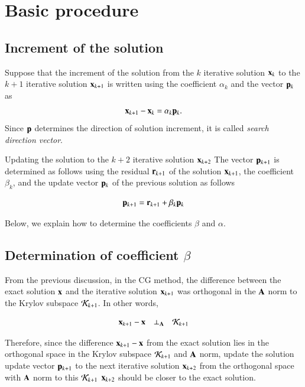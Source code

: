 \section{Basic procedure}


\subsection{Increment of the solution}

Suppose that the increment of the solution from the $k$ iterative solution $\mathbf{x}_{k}$ to the $k+1$ iterative solution $\mathbf{x}_{k+1}$ is written using the coefficient $\alpha_k$ and the vector $\mathbf{p}_k$ as
%
\begin{equation}
\mathbf{x}_{k+1}-\mathbf{x}_{k}=\alpha_{k}\mathbf{p}_{k}.
\end{equation}
%
Since $\mathbf{p}$ determines the direction of solution increment, it is called \emph{search direction vector}.



Updating the solution to the $k+2$ iterative solution $\mathbf{x}_{k+2}$ The vector $\mathbf{p}_{k+1}$ is determined as follows using the residual $\mathbf{r}_{k+1}$ of the solution $\mathbf{x}_{k+1}$, the coefficient $\beta_k$, and the update vector $\mathbf{p}_k$ of the previous solution as follows


\begin{equation}
\mathbf{p}_{k+1}=\mathbf{r}_{k+1}+\beta_k\mathbf{p}_k
\end{equation}


Below, we explain how to determine the coefficients $\beta$ and $\alpha$.



\subsection{Determination of coefficient $\beta$}


From the previous discussion, in the CG method, the difference between the exact solution $\mathbf{x}$ and the iterative solution $\mathbf{x}_{k+1}$ was orthogonal in the $\mathbf{A}$ norm to the Krylov subspace ${\cal K}_{k+1}$. In other words,

\begin{equation}
\mathbf{x}_{k+1}-\mathbf{x}\quad\bot_{\mathbf{A}}\quad{\cal K}_{k+1}
\end{equation}


Therefore, since the difference $\mathbf{x}_{k+1}-\mathbf{x}$ from the exact solution lies in the orthogonal space in the Krylov subspace ${\cal K}_{k+1}$ and $\mathbf{A}$ norm, update the solution update vector $\mathbf{p}_{k+1}$ to the next iterative solution $\mathbf{x}_{k+2}$ from the orthogonal space with $\mathbf{A}$ norm to this ${\cal K}_{k+1}$ $\mathbf{x}_{k+2}$ should be closer to the exact solution.

